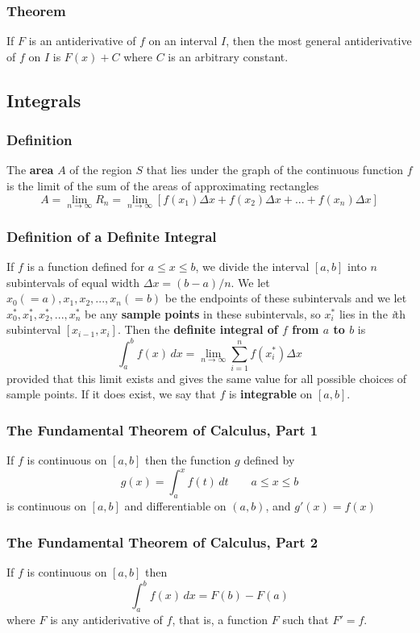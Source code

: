 \documentclass{article}
\begin{document}
\subsubsection*{Theorem}
If \(F\) is an antiderivative of \(f\) on an interval \(I\), then the most general antiderivative of \(f\) on \(I\) is \(F(x) + C\) where \(C\) is an arbitrary constant.

\subsection*{Integrals}
\subsubsection*{Definition}
The \textbf{area} \(A\) of the region \(S\) that lies under the graph of the continuous function \(f\) is the limit of the sum of the areas of approximating rectangles
\[
A = \lim_{n \to \infty} R_n = \lim_{n \to \infty} [f(x_1) \Delta x + f(x_2) \Delta x + ... + f(x_n) \Delta x]
\]

\subsubsection*{Definition of a Definite Integral}
If \(f\) is a function defined for \(a \leq x \leq b\), we divide the interval \([a,b]\) into \(n\) subintervals of equal width \(\Delta x = (b-a)/n\). We let \(x_0 (= a), x_1,x_2,...,x_n(=b)\) be the endpoints of these subintervals and we let \(x_0^*,x_1^*,x_2^*,...,x_n^*\) be any \textbf{sample points} in these subintervals, so \(x_i^*\) lies in the \textit{i}th subinterval \([x_{i-1},x_i]\). Then the \textbf{definite integral of \(f\) from \(a\) to \( b\)} is
\[
\int_a^b f(x) \, dx = \lim_{n \to \infty} \sum_{i=1}^n f(x_i^*) \Delta x
\]
provided that this limit exists and gives the same value for all possible choices of
sample points. If it does exist, we say that \(f\) is \textbf{integrable} on \([a,b]\).

\subsubsection*{The Fundamental Theorem of Calculus, Part 1}
If \(f\) is continuous on \([a,b]\) then the function \(g\) defined by
\[
g(x) = \int_a^x f(t) \, dt	\qquad a \leq x \leq b
\]
is continuous on \([a,b]\) and differentiable on \((a,b)\), and \(g'(x) = f(x)\)

\subsubsection*{The Fundamental Theorem of Calculus, Part 2}
If \(f\) is continuous on \([a,b]\) then
\[
\int_a^b f(x) \, dx	= F(b) - F(a)
\]
where \(F\) is any antiderivative of \(f\), that is, a function \(F\) such that \(F' = f\).
\end{document}
